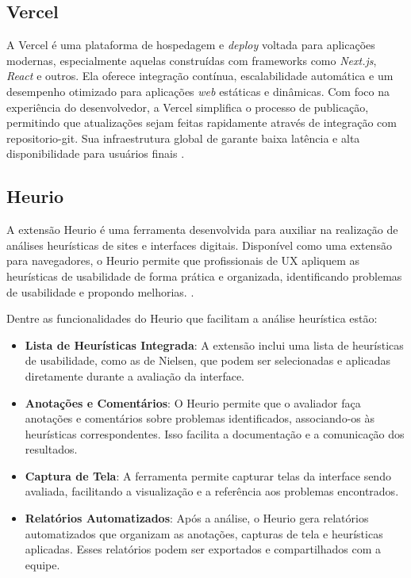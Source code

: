 {    
    \subsection{Vercel}
    A Vercel é uma plataforma de hospedagem e \textit{deploy} voltada para aplicações modernas, especialmente aquelas construídas com frameworks como \textit{Next.js}, \textit{React} e outros. Ela oferece integração contínua, escalabilidade automática e um desempenho otimizado para aplicações \textit{web} estáticas e dinâmicas. Com foco na experiência do desenvolvedor, a Vercel simplifica o processo de publicação, permitindo que atualizações sejam feitas rapidamente através de integração com \gls{repositorio-git}. Sua infraestrutura global de  garante baixa latência e alta disponibilidade para usuários finais \citep{vercel}.
    
    \subsection{Heurio}
    A extensão Heurio é uma ferramenta desenvolvida para auxiliar na realização de análises heurísticas de sites e interfaces digitais. Disponível como uma extensão para navegadores, o Heurio permite que profissionais de UX apliquem as heurísticas de usabilidade de forma prática e organizada, identificando problemas de usabilidade e propondo melhorias. \citep{Heurio}.
    
    Dentre as funcionalidades do Heurio que facilitam a análise heurística estão:
    
    \begin{itemize}
        \item \textbf{Lista de Heurísticas Integrada}: A extensão inclui uma lista de heurísticas de usabilidade, como as de Nielsen, que podem ser selecionadas e aplicadas diretamente durante a avaliação da interface.
        
        \item \textbf{Anotações e Comentários}: O Heurio permite que o avaliador faça anotações e comentários sobre problemas identificados, associando-os às heurísticas correspondentes. Isso facilita a documentação e a comunicação dos resultados.
        
        \item \textbf{Captura de Tela}: A ferramenta permite capturar telas da interface sendo avaliada, facilitando a visualização e a referência aos problemas encontrados.
        
        \item \textbf{Relatórios Automatizados}: Após a análise, o Heurio gera relatórios automatizados que organizam as anotações, capturas de tela e heurísticas aplicadas. Esses relatórios podem ser exportados e compartilhados com a equipe.
        

\end{itemize}}
